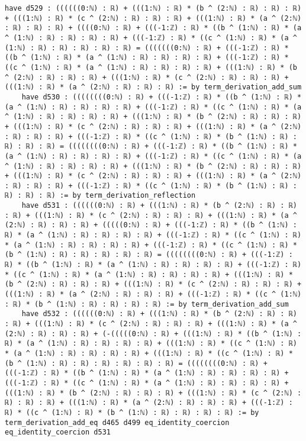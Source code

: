 \documentclass{article}
\begin{document}
\begin{tcolorbox}[colback=white!10, width=\linewidth]
\begin{lstlisting}[language=Lean4]
    have d529 : ((((((0:ℕ) : ℝ) + (((1:ℕ) : ℝ) * (b ^ (2:ℕ) : ℝ) : ℝ) : ℝ) + (((1:ℕ) : ℝ) * (c ^ (2:ℕ) : ℝ) : ℝ) : ℝ) + (((1:ℕ) : ℝ) * (a ^ (2:ℕ) : ℝ) : ℝ) : ℝ) + ((((0:ℕ) : ℝ) + (((-1:ℤ) : ℝ) * ((b ^ (1:ℕ) : ℝ) * (a ^ (1:ℕ) : ℝ) : ℝ) : ℝ) : ℝ) + (((-1:ℤ) : ℝ) * ((c ^ (1:ℕ) : ℝ) * (a ^ (1:ℕ) : ℝ) : ℝ) : ℝ) : ℝ) : ℝ) = (((((((0:ℕ) : ℝ) + (((-1:ℤ) : ℝ) * ((b ^ (1:ℕ) : ℝ) * (a ^ (1:ℕ) : ℝ) : ℝ) : ℝ) : ℝ) + (((-1:ℤ) : ℝ) * ((c ^ (1:ℕ) : ℝ) * (a ^ (1:ℕ) : ℝ) : ℝ) : ℝ) : ℝ) + (((1:ℕ) : ℝ) * (b ^ (2:ℕ) : ℝ) : ℝ) : ℝ) + (((1:ℕ) : ℝ) * (c ^ (2:ℕ) : ℝ) : ℝ) : ℝ) + (((1:ℕ) : ℝ) * (a ^ (2:ℕ) : ℝ) : ℝ) : ℝ) := by term_derivation_add_sum
    have d530 : ((((((((0:ℕ) : ℝ) + (((-1:ℤ) : ℝ) * ((b ^ (1:ℕ) : ℝ) * (a ^ (1:ℕ) : ℝ) : ℝ) : ℝ) : ℝ) + (((-1:ℤ) : ℝ) * ((c ^ (1:ℕ) : ℝ) * (a ^ (1:ℕ) : ℝ) : ℝ) : ℝ) : ℝ) + (((1:ℕ) : ℝ) * (b ^ (2:ℕ) : ℝ) : ℝ) : ℝ) + (((1:ℕ) : ℝ) * (c ^ (2:ℕ) : ℝ) : ℝ) : ℝ) + (((1:ℕ) : ℝ) * (a ^ (2:ℕ) : ℝ) : ℝ) : ℝ) + (((-1:ℤ) : ℝ) * ((c ^ (1:ℕ) : ℝ) * (b ^ (1:ℕ) : ℝ) : ℝ) : ℝ) : ℝ) = ((((((((0:ℕ) : ℝ) + (((-1:ℤ) : ℝ) * ((b ^ (1:ℕ) : ℝ) * (a ^ (1:ℕ) : ℝ) : ℝ) : ℝ) : ℝ) + (((-1:ℤ) : ℝ) * ((c ^ (1:ℕ) : ℝ) * (a ^ (1:ℕ) : ℝ) : ℝ) : ℝ) : ℝ) + (((1:ℕ) : ℝ) * (b ^ (2:ℕ) : ℝ) : ℝ) : ℝ) + (((1:ℕ) : ℝ) * (c ^ (2:ℕ) : ℝ) : ℝ) : ℝ) + (((1:ℕ) : ℝ) * (a ^ (2:ℕ) : ℝ) : ℝ) : ℝ) + (((-1:ℤ) : ℝ) * ((c ^ (1:ℕ) : ℝ) * (b ^ (1:ℕ) : ℝ) : ℝ) : ℝ) : ℝ) := by term_derivation_reflection
    have d531 : ((((((0:ℕ) : ℝ) + (((1:ℕ) : ℝ) * (b ^ (2:ℕ) : ℝ) : ℝ) : ℝ) + (((1:ℕ) : ℝ) * (c ^ (2:ℕ) : ℝ) : ℝ) : ℝ) + (((1:ℕ) : ℝ) * (a ^ (2:ℕ) : ℝ) : ℝ) : ℝ) + (((((0:ℕ) : ℝ) + (((-1:ℤ) : ℝ) * ((b ^ (1:ℕ) : ℝ) * (a ^ (1:ℕ) : ℝ) : ℝ) : ℝ) : ℝ) + (((-1:ℤ) : ℝ) * ((c ^ (1:ℕ) : ℝ) * (a ^ (1:ℕ) : ℝ) : ℝ) : ℝ) : ℝ) + (((-1:ℤ) : ℝ) * ((c ^ (1:ℕ) : ℝ) * (b ^ (1:ℕ) : ℝ) : ℝ) : ℝ) : ℝ) : ℝ) = ((((((((0:ℕ) : ℝ) + (((-1:ℤ) : ℝ) * ((b ^ (1:ℕ) : ℝ) * (a ^ (1:ℕ) : ℝ) : ℝ) : ℝ) : ℝ) + (((-1:ℤ) : ℝ) * ((c ^ (1:ℕ) : ℝ) * (a ^ (1:ℕ) : ℝ) : ℝ) : ℝ) : ℝ) + (((1:ℕ) : ℝ) * (b ^ (2:ℕ) : ℝ) : ℝ) : ℝ) + (((1:ℕ) : ℝ) * (c ^ (2:ℕ) : ℝ) : ℝ) : ℝ) + (((1:ℕ) : ℝ) * (a ^ (2:ℕ) : ℝ) : ℝ) : ℝ) + (((-1:ℤ) : ℝ) * ((c ^ (1:ℕ) : ℝ) * (b ^ (1:ℕ) : ℝ) : ℝ) : ℝ) : ℝ) := by term_derivation_add_sum
    have d532 : ((((((0:ℕ) : ℝ) + (((1:ℕ) : ℝ) * (b ^ (2:ℕ) : ℝ) : ℝ) : ℝ) + (((1:ℕ) : ℝ) * (c ^ (2:ℕ) : ℝ) : ℝ) : ℝ) + (((1:ℕ) : ℝ) * (a ^ (2:ℕ) : ℝ) : ℝ) : ℝ) + (-(((((0:ℕ) : ℝ) + (((1:ℕ) : ℝ) * ((b ^ (1:ℕ) : ℝ) * (a ^ (1:ℕ) : ℝ) : ℝ) : ℝ) : ℝ) + (((1:ℕ) : ℝ) * ((c ^ (1:ℕ) : ℝ) * (a ^ (1:ℕ) : ℝ) : ℝ) : ℝ) : ℝ) + (((1:ℕ) : ℝ) * ((c ^ (1:ℕ) : ℝ) * (b ^ (1:ℕ) : ℝ) : ℝ) : ℝ) : ℝ) : ℝ) : ℝ) = ((((((((0:ℕ) : ℝ) + (((-1:ℤ) : ℝ) * ((b ^ (1:ℕ) : ℝ) * (a ^ (1:ℕ) : ℝ) : ℝ) : ℝ) : ℝ) + (((-1:ℤ) : ℝ) * ((c ^ (1:ℕ) : ℝ) * (a ^ (1:ℕ) : ℝ) : ℝ) : ℝ) : ℝ) + (((1:ℕ) : ℝ) * (b ^ (2:ℕ) : ℝ) : ℝ) : ℝ) + (((1:ℕ) : ℝ) * (c ^ (2:ℕ) : ℝ) : ℝ) : ℝ) + (((1:ℕ) : ℝ) * (a ^ (2:ℕ) : ℝ) : ℝ) : ℝ) + (((-1:ℤ) : ℝ) * ((c ^ (1:ℕ) : ℝ) * (b ^ (1:ℕ) : ℝ) : ℝ) : ℝ) : ℝ) := by term_derivation_add_eq d465 d499 eq_identity_coercion eq_identity_coercion d531

\end{lstlisting}
\end{tcolorbox}
\end{document}
